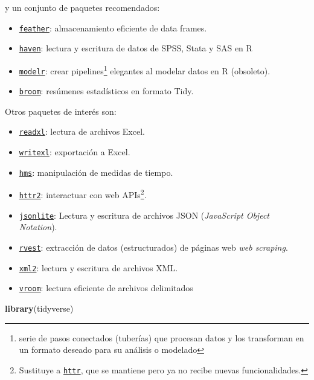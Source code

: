 \documentclass[
]{book}
\newenvironment{Shaded}{\begin{snugshade}}{\end{snugshade}}
\newcommand{\FunctionTok}[1]{\textcolor[rgb]{0.13,0.29,0.53}{\textbf{#1}}}
\newcommand{\NormalTok}[1]{#1}
\providecommand{\tightlist}{%
  \setlength{\itemsep}{0pt}\setlength{\parskip}{0pt}}
\theoremstyle{break}
\theoremstyle{nonumberplain}
\let\oldfootnote\footnote
\renewcommand\footnote[1]{\oldfootnote{\hspace{2mm}#1}}
\begin{document}
y un conjunto de paquetes recomendados:

\begin{itemize}
\tightlist
\item
  \href{https://github.com/wesm/feather}{\texttt{feather}}: almacenamiento eficiente de data frames.
\item
  \href{https://github.com/tidyverse/haven}{\texttt{haven}}: lectura y escritura de datos de SPSS, Stata y SAS en R
\item
  \href{https://github.com/tidyverse/modelr}{\texttt{modelr}}: crear pipelines\footnote{serie de pasos conectados (tuberías) que procesan datos y los transforman en un formato deseado para su análisis o modelado} elegantes al modelar datos en R (obsoleto).
\item
  \href{https://github.com/tidymodels/broom}{\texttt{broom}}: resúmenes estadísticos en formato Tidy.
\end{itemize}

Otros paquetes de interés son:

\begin{itemize}
\tightlist
\item
  \href{https://github.com/tidyverse/readxl}{\texttt{readxl}}: lectura de archivos Excel.
\item
  \href{https://github.com/ropensci/writexl}{\texttt{writexl}}: exportación a Excel.
\item
  \href{https://github.com/tidyverse/hms}{\texttt{hms}}: manipulación de medidas de tiempo.
\item
  \href{https://httr2.r-lib.org}{\texttt{httr2}}: interactuar con web APIs\footnote{Sustituye a \href{https://github.com/r-lib/httr}{\texttt{httr}}, que se mantiene pero ya no recibe nuevas funcionalidades.}.
\item
  \href{https://github.com/jeroen/jsonlite}{\texttt{jsonlite}}: Lectura y escritura de archivos JSON (\emph{JavaScript Object Notation}).
\item
  \href{https://github.com/tidyverse/rvest}{\texttt{rvest}}: extracción de datos (estructurados) de páginas web \emph{web scraping}.
\item
  \href{https://github.com/r-lib/xml2}{\texttt{xml2}}: lectura y escritura de archivos XML.
\item
  \href{https://github.com/tidyverse/vroom}{\texttt{vroom}}: lectura eficiente de archivos delimitados
\end{itemize}

\begin{Shaded}
\begin{Highlighting}[]
\FunctionTok{library}\NormalTok{(tidyverse)}
\end{Highlighting}
\end{Shaded}
\end{document}
